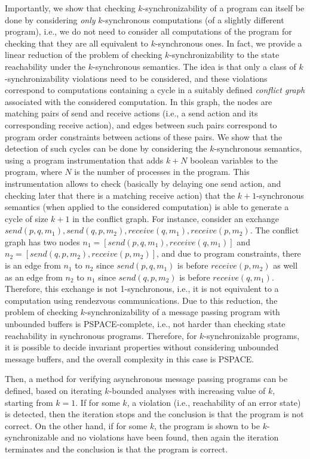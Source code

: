 Importantly, we show that checking $k$-synchronizability of a program can itself be done by considering {\em only} $k$-synchronous computations (of a slightly different program), i.e., we do not need to consider all computations of the program for checking that they are all equivalent to $k$-synchronous ones. In fact, we provide a linear reduction of the problem of checking $k$-synchronizability to the state reachability under the $k$-synchronous semantics. The idea is that only a class of $k$-synchronizability violations need to be considered, and these violations correspond to computations containing a cycle in a suitably defined {\em conflict graph} associated with the considered computation. In this graph, the nodes are matching pairs of send and receive actions (i.e., a send action and its corresponding receive action), and edges between such pairs correspond to program order constraints between actions of these pairs. We show that the detection of such cycles can be done by considering the $k$-synchronous semantics, using a program instrumentation that adds $k + N$ boolean variables to the program, where $N$ is the number of processes in the program. This instrumentation allows to check (basically by delaying one send action, and checking later that there is a matching receive action) that the $k+1$-synchronous semantics (when applied to the considered computation) is able to generate a cycle of size $k+1$ in the conflict graph. For instance, consider an exchange $send (p, q, m_1), send (q, p, m_2), receive (q, m_1), receive (p, m_2)$. The conflict graph has two nodes $n_1 = [ send(p, q, m_1), receive (q, m_1) ]$ and $n_2 = [ send(q, p, m_2), receive (p, m_2) ]$, and due to program constraints, there is an edge from $n_1$ to $n_2$ since $send(p, q, m_1)$ is before $receive (p, m_2)$ as well as an edge from $n_2$ to $n_1$ since $send(q, p, m_2)$ is before $receive (q, m_1)$. Therefore, this exchange is not 1-synchronous, i.e., it is not equivalent to a computation using rendezvous communications. 
Due to this reduction, the problem of checking $k$-synchronizability of a message passing program with unbounded buffers is PSPACE-complete, i.e., not harder than checking state reachability in synchronous programs. Therefore, for $k$-synchronizable programs, it is possible to decide invariant properties without considering unbounded message buffers, and the overall complexity in this case is PSPACE. 

Then, a method for verifying asynchronous message passing programs can be defined, 
based on iterating $k$-bounded analyses with increasing value of $k$, starting from $k=1$. If for some $k$, a violation (i.e., reachability of an error state) is detected, then the iteration stops and the conclusion is that the program is not correct. On the other hand, if for some $k$, the program is shown to be $k$-synchronizable and no violations have been found, then again the iteration terminates and the conclusion is that the program is correct. 

